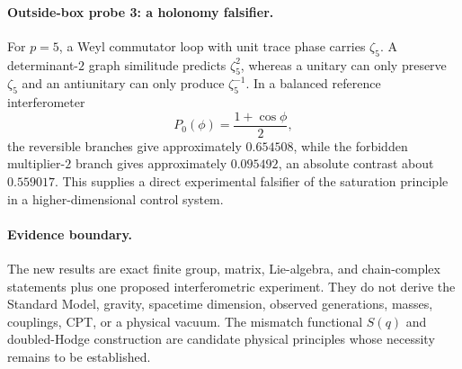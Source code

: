 \paragraph{Outside-box probe 3: a holonomy falsifier.}
For $p=5$, a Weyl commutator loop with unit trace phase carries
$\zeta_5$.  A determinant-$2$ graph similitude predicts $\zeta_5^2$, whereas
a unitary can only preserve $\zeta_5$ and an antiunitary can only produce
$\zeta_5^{-1}$.  In a balanced reference interferometer
\[
P_0(\phi)=\frac{1+\cos\phi}{2},
\]
the reversible branches give approximately $0.654508$, while the forbidden
multiplier-$2$ branch gives approximately $0.095492$, an absolute contrast
about $0.559017$.  This supplies a direct experimental falsifier of the
saturation principle in a higher-dimensional control system.

\paragraph{Evidence boundary.}
The new results are exact finite group, matrix, Lie-algebra, and chain-complex
statements plus one proposed interferometric experiment.  They do not derive
the Standard Model, gravity, spacetime dimension, observed generations,
masses, couplings, CPT, or a physical vacuum.  The mismatch functional
$S(q)$ and doubled-Hodge construction are candidate physical principles whose
necessity remains to be established.
